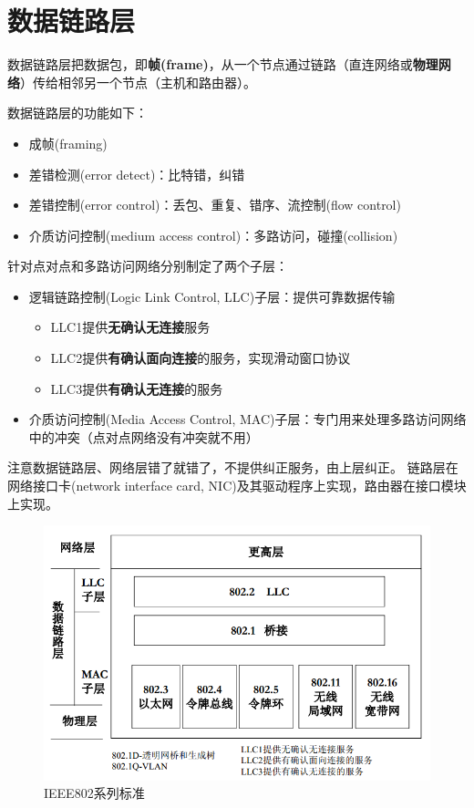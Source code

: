 
\section{数据链路层}
数据链路层把数据包，即\textbf{帧(frame)}，从一个节点通过链路（直连网络或\textbf{物理网络}）传给相邻另一个节点（主机和路由器）。

数据链路层的功能如下：
\begin{itemize}
	\item 成帧(framing)
	\item 差错检测(error detect)：比特错，纠错
	\item 差错控制(error control)：丢包、重复、错序、流控制(flow control)
	\item 介质访问控制(medium access control)：多路访问，碰撞(collision)
\end{itemize}

针对点对点和多路访问网络分别制定了两个子层：
\begin{itemize}
	\item 逻辑链路控制(Logic Link Control, LLC)子层：提供可靠数据传输
	\begin{itemize}
		\item LLC1提供\textbf{无确认无连接}服务
		\item LLC2提供\textbf{有确认面向连接}的服务，实现滑动窗口协议
		\item LLC3提供\textbf{有确认无连接}的服务
	\end{itemize}
	\item 介质访问控制(Media Access Control, MAC)子层：专门用来处理多路访问网络中的冲突（点对点网络没有冲突就不用）
\end{itemize}

注意数据链路层、网络层错了就错了，不提供纠正服务，由上层纠正。
链路层在网络接口卡(network interface card, NIC)及其驱动程序上实现，路由器在接口模块上实现。

\begin{figure}[H]
	\centering
	\includegraphics[width=0.6\linewidth]{fig/ieee802.PNG}
	\caption*{IEEE802系列标准}
\end{figure}


